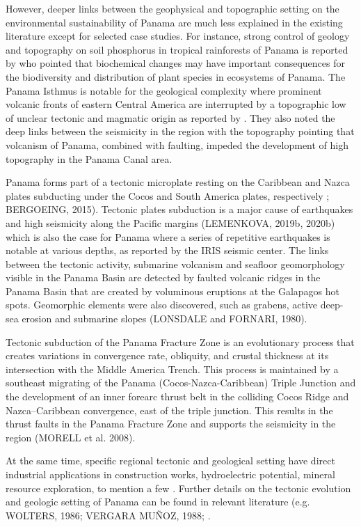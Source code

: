 \documentclass[10pt,twoside,twocolumn,a4paper]{article}
\begin{document}
However, deeper links between the geophysical and topographic setting on the environmental sustainability of Panama are much less explained in the existing literature except for selected case studies. For instance, strong control of geology and topography on soil phosphorus in tropical rainforests of Panama is reported by \cite{Dieter} who pointed that biochemical changes may have important consequences for the biodiversity and distribution of plant species in ecosystems of Panama.  
The Panama Isthmus is notable for the geological complexity where prominent volcanic fronts of eastern Central America are interrupted by a topographic low of unclear tectonic and magmatic origin as reported by \cite{Buchs}. They also noted the deep links between the seismicity in the region with the topography pointing that volcanism of Panama, combined with faulting, impeded the development of high topography in the Panama Canal area.

Panama forms part of a tectonic microplate resting on the Caribbean and Nazca plates subducting under the Cocos and South America plates, respectively \cite{Demets}; BERGOEING, 2015). Tectonic plates subduction is a major cause of earthquakes and high seismicity along the Pacific margins (LEMENKOVA, 2019b, 2020b) which is also the case for Panama where a series of repetitive earthquakes is notable at various depths, as reported by the IRIS seismic center. 
The links between the tectonic activity, submarine volcanism and seafloor geomorphology visible in the Panama Basin are detected by faulted volcanic ridges in the Panama Basin that are created by voluminous eruptions at the Galapagos hot spots. Geomorphic elements were also discovered, such as grabens,  active deep-sea erosion and submarine slopes (LONSDALE and FORNARI, 1980). 

Tectonic subduction of the Panama Fracture Zone is an evolutionary process that creates variations in convergence rate, obliquity, and crustal thickness at its intersection with the Middle America Trench. This process is maintained by a southeast migrating of the Panama (Cocos-Nazca-Caribbean) Triple Junction and the development of an inner forearc thrust belt in the colliding Cocos Ridge and Nazca–Caribbean convergence, east of the triple junction. This results in the thrust faults in the Panama Fracture Zone and supports the seismicity in the region (MORELL et al. 2008).

At the same time, specific regional tectonic and geological setting have direct industrial applications in construction works, hydroelectric potential, mineral resource exploration, to mention a few \cite{Palacio,Corral}. Further details on the tectonic evolution and geologic setting of Panama can be found in relevant literature (e.g. WOLTERS, 1986; VERGARA MUÑOZ, 1988; \cite{Cardona,Fuchs,Hardy}. 
\end{document}

